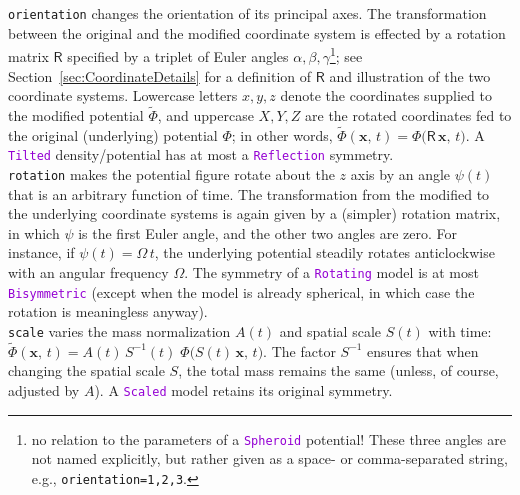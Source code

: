 \documentclass[12pt]{article}
\newcommand{\ttt}[1]{\textcolor{darkviolet}{\texttt{#1}}}
\newcommand{\ppp}[1]{\textcolor{darkolive} {\texttt{#1}}}
\begin{document}
\begin{itemize}
%
\ppp{orientation} changes the orientation of its principal axes. The transformation between the original and the modified coordinate system is effected by a rotation matrix $\mathsf{R}$ specified by a triplet of Euler angles $\alpha,\beta,\gamma$\footnote{no relation to the parameters of a \ttt{Spheroid} potential! These three angles are not named explicitly, but rather given as a space- or comma-separated string, e.g., \ppp{orientation=1,2,3}.}; see Section~\ref{sec:CoordinateDetails} for a definition of $\mathsf{R}$ and illustration of the two coordinate systems. Lowercase letters $x,y,z$ denote the coordinates supplied to the modified potential $\widetilde\Phi$, and uppercase $X,Y,Z$ are the rotated coordinates fed to the original (underlying) potential $\Phi$; in other words, $\widetilde\Phi(\boldsymbol x,\,t) = \Phi\big(\mathsf{R}\,\boldsymbol x,\,t\big)$. A \ttt{Tilted} density/potential has at most a \ttt{Reflection} symmetry.\\
%
\ppp{rotation} makes the potential figure rotate about the $z$ axis by an angle $\psi(t)$ that is an arbitrary function of time. The transformation from the modified to the underlying coordinate systems is again given by a (simpler) rotation matrix, in which $\psi$ is the first Euler angle, and the other two angles are zero. For instance, if $\psi(t) = \Omega\,t$, the underlying potential steadily rotates anticlockwise with an angular frequency $\Omega$. The symmetry of a \ttt{Rotating} model is at most \ttt{Bisymmetric} (except when the model is already spherical, in which case the rotation is meaningless anyway).\\
%
\ppp{scale} varies the mass normalization $A(t)$ and spatial scale $S(t)$ with time: $\widetilde\Phi(\boldsymbol x,\,t) = A(t)\,S^{-1}(t)\; \Phi\big( S(t)\,\boldsymbol x,\,t\big)$. The factor $S^{-1}$ ensures that when changing the spatial scale $S$, the total mass remains the same (unless, of course, adjusted by $A$). A \ttt{Scaled} model retains its original symmetry.\\
%

\end{itemize}
\end{document}
